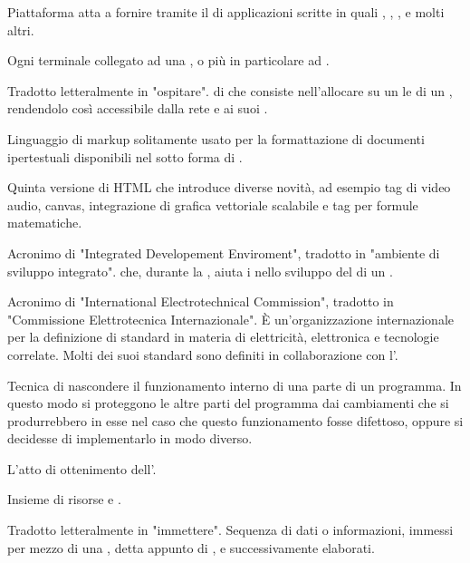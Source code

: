 {Piattaforma  atta a fornire  tramite il  di applicazioni scritte in  quali , , , e molti altri.}

{Ogni terminale collegato ad una , o più in particolare ad .}

{Tradotto letteralmente in "ospitare".  di  che consiste nell'allocare su un  le  di un , rendendolo così accessibile dalla rete  e ai suoi .}

{Linguaggio di markup solitamente usato per la formattazione di documenti ipertestuali disponibili nel  sotto forma di .}

{Quinta versione di HTML che introduce diverse novità, ad esempio tag di video audio, canvas, integrazione di grafica vettoriale scalabile e tag per formule matematiche.}




{Acronimo di "Integrated Developement Enviroment", tradotto in "ambiente di sviluppo integrato".  che, durante la , aiuta i  nello sviluppo del  di un .}

{Acronimo di "International Electrotechnical Commission", tradotto in "Commissione Elettrotecnica Internazionale". \`{E} un'organizzazione internazionale per la definizione di standard in materia di elettricità, elettronica e tecnologie correlate. Molti dei suoi standard sono definiti in collaborazione con l'.}

{Tecnica di nascondere il funzionamento interno di una parte di un programma. In questo modo si proteggono le altre parti del programma dai cambiamenti che si produrrebbero in esse nel caso che questo funzionamento fosse difettoso, oppure si decidesse di implementarlo in modo diverso.}

{L'atto di ottenimento dell'.}

{Insieme di risorse  e .}

{Tradotto letteralmente in "immettere". Sequenza di dati o informazioni, immessi per mezzo di una , detta appunto di , e successivamente elaborati.}

